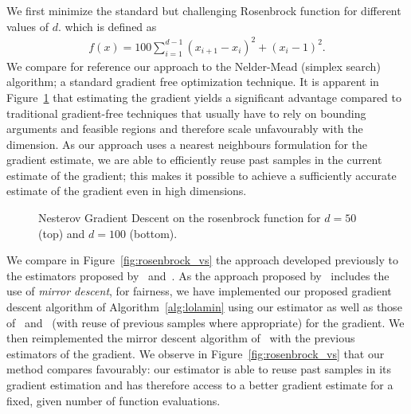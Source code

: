 We first minimize the standard but challenging Rosenbrock function for different values of $d$. which is defined as
\begin{align}
    f(x) = 100 \sum_{i=1}^{d-1} (x_{i+1} - x_i)^2 + (x_i - 1)^2.
\end{align}
We compare for reference our approach to the Nelder-Mead (simplex search) algorithm; a standard gradient free optimization technique.
It is apparent in Figure~\ref{fig:rosenbrock_grad} that estimating the gradient yields a significant advantage compared to traditional gradient-free techniques that usually have to rely on bounding arguments and feasible regions and therefore scale unfavourably with the dimension. As our approach uses a nearest neighbours formulation for the gradient estimate, we are able to efficiently reuse past samples in the current estimate of the gradient; this makes it possible to achieve a sufficiently accurate estimate of the gradient even in high dimensions.
\begin{figure}
    \centering
    \begin{subfigure}[t]{1.\linewidth}
        \centering
    \end{subfigure}
    \hfill
    \begin{subfigure}[t]{1.\linewidth}
        \centering
    \end{subfigure}
    \caption{Nesterov Gradient Descent on the rosenbrock function for $d=50$ (top) and $d=100$ (bottom).}\label{fig:rosenbrock_grad}
\end{figure}
We compare in Figure~\ref{fig:rosenbrock_vs} the approach developed previously to the estimators proposed by~\cite{wangStochasticZerothorderOptimization2018} and~\cite{fanDesignadaptiveNonparametricRegression1992}. As the approach proposed by~\cite{wangStochasticZerothorderOptimization2018} includes the use of \emph{mirror descent}, for fairness, we have implemented our proposed gradient descent algorithm of Algorithm~\ref{alg:lolamin} using our estimator as well as those of~\cite{wangStochasticZerothorderOptimization2018} and~\cite{fanLocalLinearRegression1993} (with reuse of previous samples where appropriate) for the gradient. We then reimplemented the mirror descent algorithm of~\cite{wangStochasticZerothorderOptimization2018} with the previous estimators of the gradient. We observe in Figure~\ref{fig:rosenbrock_vs} that our method compares favourably: our estimator is able to reuse past samples in its gradient estimation and has therefore access to a better gradient estimate for a fixed, given number of function evaluations.
